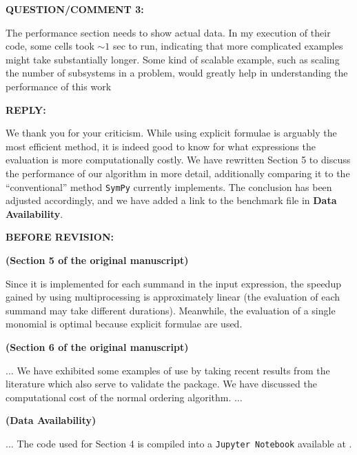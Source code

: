 \documentclass[12pt, a4paper]{article}
\newenvironment{revq}[1]{%
\newpage\phantomsection
\color{RoyalPurple}
\par
\textbf{QUESTION/COMMENT {#1}:}
\par
}
{\bigskip}
\newenvironment{reva}{%
\color{Black}
\par
\textbf{REPLY:}
\par
}
{\bigskip}
\newenvironment{revpre}{%
\textbf{{BEFORE REVISION:}}
\par
}
{\bigskip}
\begin{document}

\begin{revq}{3}
The performance section needs to show actual data. In my execution of their code, some cells took $\sim 1$ sec to run, indicating that more complicated examples might take substantially longer. Some kind of scalable example, such as scaling the number of subsystems in a problem, would greatly help in understanding the performance of this work
\end{revq}

\begin{reva}
We thank you for your criticism. While using explicit formulae is arguably the most efficient method, it is indeed good to know for what expressions the evaluation is more computationally costly. We have rewritten Section 5 to discuss the performance of our algorithm in more detail, additionally comparing it to the ``conventional'' method \texttt{SymPy} currently implements. The conclusion has been adjusted accordingly, and we have added a link to the benchmark file in \textbf{Data Availability}.
\end{reva}

\begin{revpre}

\textbf{(Section 5 of the original manuscript)}

Since it is implemented for each summand in the input expression, the speedup gained by using multiprocessing is approximately linear (the evaluation of each summand may take different durations). Meanwhile, the evaluation of a single monomial is optimal because explicit formulae are used.

\textbf{(Section 6 of the original manuscript)}

$\dots$ We have exhibited some examples of use by taking recent results from the literature which also serve to validate the package. We have discussed the computational cost of the normal ordering algorithm. $\dots$

\textbf{(Data Availability)}

$\dots$ The code used for Section 4 is compiled into a \texttt{Jupyter Notebook} available at \href{https://github.com/hendry24/pyBoLaNO/blob/main/tutorial.ipynb}{}.

\end{revpre}
\end{document}
